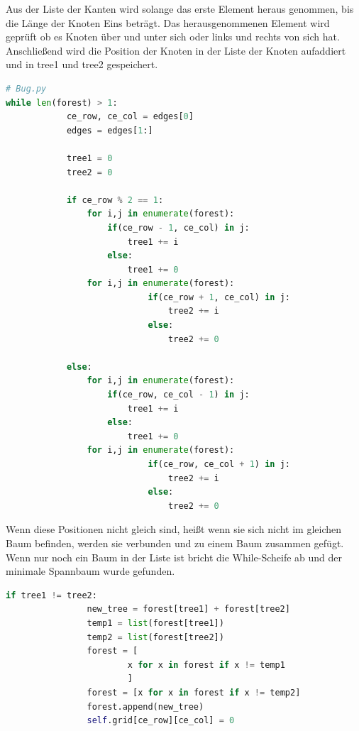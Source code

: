 \documentclass[12pt, a4paper, titlepage]{article}
\begin{document}
Aus der Liste der Kanten wird solange das erste Element heraus genommen, bis die Länge der Knoten Eins beträgt.
Das herausgenommenen Element wird geprüft ob es Knoten über und unter sich oder links und rechts von sich hat.
Anschließend wird die Position der Knoten in der Liste der Knoten aufaddiert und in tree1 und tree2 gespeichert.

\begin{lstlisting}[language = Python]
# Bug.py
while len(forest) > 1:
            ce_row, ce_col = edges[0]
            edges = edges[1:]
        
            tree1 = 0
            tree2 = 0
        
            if ce_row % 2 == 1:
                for i,j in enumerate(forest):
                    if(ce_row - 1, ce_col) in j:
                        tree1 += i
                    else:
                        tree1 += 0
                for i,j in enumerate(forest):
                            if(ce_row + 1, ce_col) in j:
                                tree2 += i
                            else:
                                tree2 += 0
                
            else:
                for i,j in enumerate(forest):
                    if(ce_row, ce_col - 1) in j:
                        tree1 += i
                    else:
                        tree1 += 0
                for i,j in enumerate(forest):
                            if(ce_row, ce_col + 1) in j:
                                tree2 += i
                            else:
                                tree2 += 0
\end{lstlisting}

Wenn diese Positionen nicht gleich sind, heißt wenn sie sich nicht im gleichen Baum befinden, werden sie verbunden und zu einem Baum zusammen gefügt.
Wenn nur noch ein Baum in der Liste ist bricht die While-Scheife ab und der minimale Spannbaum wurde gefunden.

\begin{lstlisting}[language = Python]
if tree1 != tree2:
                new_tree = forest[tree1] + forest[tree2]
                temp1 = list(forest[tree1])
                temp2 = list(forest[tree2])
                forest = [
                        x for x in forest if x != temp1
                        ]
                forest = [x for x in forest if x != temp2]
                forest.append(new_tree)
                self.grid[ce_row][ce_col] = 0
\end{lstlisting}
\end{document}
